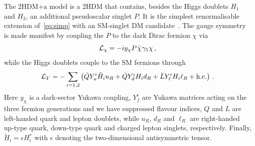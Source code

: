 \documentclass[a4paper, 11pt,notoc]{article}
\newcommand{\hdma}{\ensuremath{\textrm{2HDM+a}}\xspace}
\begin{document}
The \hdma model is a 2HDM that contains, besides the Higgs doublets $H_1$ and $H_2$, an additional pseudoscalar singlet $P$. It is the simplest renormalisable extension of~\eqref{eq:simp} with {\color{green} an} SM-singlet DM candidate~\cite{Ipek:2014gua,No:2015xqa,Goncalves:2016iyg,Bauer:2017ota,Tunney:2017yfp}. The gauge symmetry is made manifest by coupling the $P$ to the dark Dirac fermion  $\chi$ via
\begin{equation} \label{eq:Lx}
{\cal L}_\chi = - i y_\chi P \hspace{0.25mm} \bar \chi \hspace{0.25mm} \gamma_5 \hspace{0.1mm} \chi \,,
\end{equation}
while the Higgs doublets couple to the SM fermions through
\begin{equation} \label{eq:LY}
{\cal L}_{Y} = - \sum_{i=1,2} \left ( \bar Q Y_u^i \tilde H_i u_R  + \bar Q Y_d^i H_i d_R   + \bar L Y_\ell^i H_i \ell_R  + {\rm h.c.}  \right ) \,.
\end{equation}
Here $y_\chi$ is a dark-sector Yukawa coupling, $Y_f^i$ are Yukawa matrices acting on the three fermion generations and we have suppressed flavour indices, $Q$ and $L$ are left-handed quark and lepton doublets, while $u_R$, $d_R$ and $\ell_R$ are right-handed up-type quark, down-type quark and charged lepton singlets, respectively. Finally, $\tilde H_i = \epsilon H_i^\ast$ with $\epsilon$ denoting the  two-dimensional antisymmetric tensor.
\end{document}
